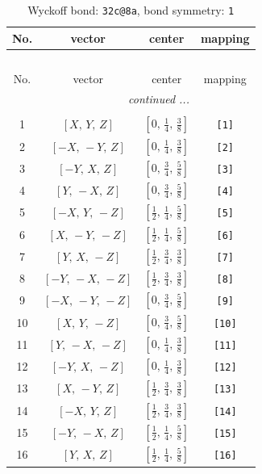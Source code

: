 \documentclass[fleqn,8pt]{jsarticle}
\begin{document}
\begin{longtable}{cccc}
\caption{Wyckoff bond: {\tt 32c@8a}, bond symmetry: {\tt 1}}
 \\
 \hline \hline
No. & vector & center & mapping \\ \hline \endfirsthead

\multicolumn{3}{l}{\tablename\ \thetable{}} \\
 \hline \hline
No. & vector & center & mapping \\ \hline \endhead

 \hline \hline
\multicolumn{3}{r}{\footnotesize\it continued ...} \\ \endfoot

 \hline \hline
\multicolumn{3}{r}{} \\ \endlastfoot

1 & $\left[ X,\, Y,\, Z \right]$ & $\left[ 0,\, \frac{1}{4},\, \frac{3}{8} \right]$ & {\tt [1]} \\ \hline
2 & $\left[ - X,\, - Y,\, Z \right]$ & $\left[ 0,\, \frac{1}{4},\, \frac{3}{8} \right]$ & {\tt [2]} \\ \hline
3 & $\left[ - Y,\, X,\, Z \right]$ & $\left[ 0,\, \frac{3}{4},\, \frac{5}{8} \right]$ & {\tt [3]} \\ \hline
4 & $\left[ Y,\, - X,\, Z \right]$ & $\left[ 0,\, \frac{3}{4},\, \frac{5}{8} \right]$ & {\tt [4]} \\ \hline
5 & $\left[ - X,\, Y,\, - Z \right]$ & $\left[ \frac{1}{2},\, \frac{1}{4},\, \frac{5}{8} \right]$ & {\tt [5]} \\ \hline
6 & $\left[ X,\, - Y,\, - Z \right]$ & $\left[ \frac{1}{2},\, \frac{1}{4},\, \frac{5}{8} \right]$ & {\tt [6]} \\ \hline
7 & $\left[ Y,\, X,\, - Z \right]$ & $\left[ \frac{1}{2},\, \frac{3}{4},\, \frac{3}{8} \right]$ & {\tt [7]} \\ \hline
8 & $\left[ - Y,\, - X,\, - Z \right]$ & $\left[ \frac{1}{2},\, \frac{3}{4},\, \frac{3}{8} \right]$ & {\tt [8]} \\ \hline
9 & $\left[ - X,\, - Y,\, - Z \right]$ & $\left[ 0,\, \frac{3}{4},\, \frac{5}{8} \right]$ & {\tt [9]} \\ \hline
10 & $\left[ X,\, Y,\, - Z \right]$ & $\left[ 0,\, \frac{3}{4},\, \frac{5}{8} \right]$ & {\tt [10]} \\ \hline
11 & $\left[ Y,\, - X,\, - Z \right]$ & $\left[ 0,\, \frac{1}{4},\, \frac{3}{8} \right]$ & {\tt [11]} \\ \hline
12 & $\left[ - Y,\, X,\, - Z \right]$ & $\left[ 0,\, \frac{1}{4},\, \frac{3}{8} \right]$ & {\tt [12]} \\ \hline
13 & $\left[ X,\, - Y,\, Z \right]$ & $\left[ \frac{1}{2},\, \frac{3}{4},\, \frac{3}{8} \right]$ & {\tt [13]} \\ \hline
14 & $\left[ - X,\, Y,\, Z \right]$ & $\left[ \frac{1}{2},\, \frac{3}{4},\, \frac{3}{8} \right]$ & {\tt [14]} \\ \hline
15 & $\left[ - Y,\, - X,\, Z \right]$ & $\left[ \frac{1}{2},\, \frac{1}{4},\, \frac{5}{8} \right]$ & {\tt [15]} \\ \hline
16 & $\left[ Y,\, X,\, Z \right]$ & $\left[ \frac{1}{2},\, \frac{1}{4},\, \frac{5}{8} \right]$ & {\tt [16]} \\
\end{longtable}
\end{document}

